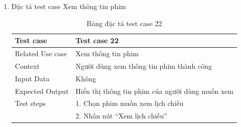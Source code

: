 \documentclass[a4paper, 12pt]{article}
\begin{document}
\begin{enumerate}
	\item Đặc tả test case Xem thông tin phim
	\begin{table}[H]
		\centering
		\begin{tabular}{|l|l|} 
		\hline
		\multicolumn{1}{|l|}{Test case} & \multicolumn{1}{l|}{Test case 22}                \\ 
		\hline
		Related Use case                & Xem thông tin phim                               \\ 
		\hline
		Context                         & Người dùng xem thông tin phim thành công         \\ 
		\hline
		Input Data                      & Không                                            \\ 
		\hline
		Expected Output                 & Hiển thị thông tin phim của người dùng muốn xem  \\ 
		\hline
		Test steps                      & 1. Chọn phim muốn xem lịch chiếu                  \\
										& 2. Nhấn nút “Xem lịch chiếu”                      \\
		\hline
		\end{tabular}
		\caption{Bảng đặc tả test case 22}
	\end{table}

	\clearpage


\end{enumerate}
\end{document}
